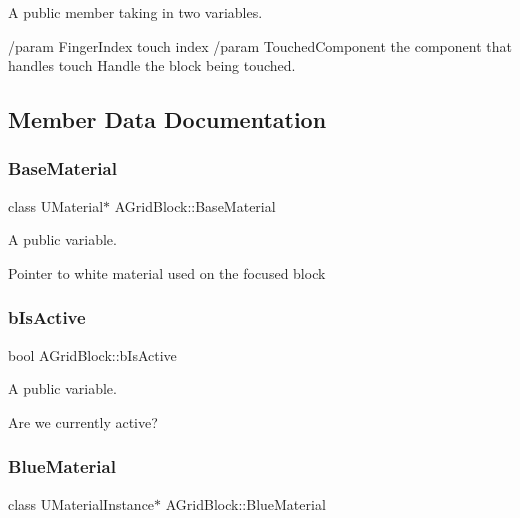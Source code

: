 A public member taking in two variables. 

/param Finger\+Index touch index /param Touched\+Component the component that handles touch Handle the block being touched. 

\subsection{Member Data Documentation}
\hypertarget{class_a_grid_block_a30a0b537773f34ab41c2881f8e124f3a}{}\label{class_a_grid_block_a30a0b537773f34ab41c2881f8e124f3a} 
\subsubsection{\texorpdfstring{Base\+Material}{BaseMaterial}}
{\footnotesize\ttfamily class U\+Material$\ast$ A\+Grid\+Block\+::\+Base\+Material}



A public variable. 

Pointer to white material used on the focused block \hypertarget{class_a_grid_block_a60c1ca6cb04e583147be45b85e3a1831}{}\label{class_a_grid_block_a60c1ca6cb04e583147be45b85e3a1831} 
\subsubsection{\texorpdfstring{b\+Is\+Active}{bIsActive}}
{\footnotesize\ttfamily bool A\+Grid\+Block\+::b\+Is\+Active}



A public variable. 

Are we currently active? \hypertarget{class_a_grid_block_a5687a984bdcb701c04af87d875c27e1f}{}\label{class_a_grid_block_a5687a984bdcb701c04af87d875c27e1f} 
\subsubsection{\texorpdfstring{Blue\+Material}{BlueMaterial}}
{\footnotesize\ttfamily class U\+Material\+Instance$\ast$ A\+Grid\+Block\+::\+Blue\+Material}



